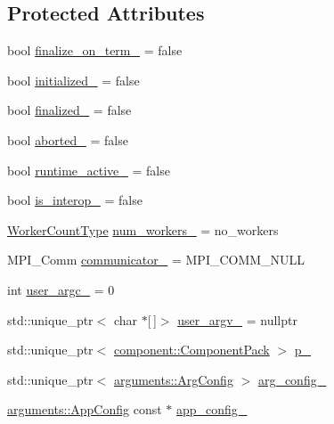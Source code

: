 \subsection*{Protected Attributes}
\begin{DoxyCompactItemize}
\item 
bool \hyperlink{structvt_1_1runtime_1_1_runtime_a1a7a0e6783b3326a4ded84f829a1d0b3}{finalize\+\_\+on\+\_\+term\+\_\+} = false
\item 
bool \hyperlink{structvt_1_1runtime_1_1_runtime_aaaad29e0591814b8f0632f2f85bd5e16}{initialized\+\_\+} = false
\item 
bool \hyperlink{structvt_1_1runtime_1_1_runtime_a2a798a2bf9b8c0a70785cde3cc8119c4}{finalized\+\_\+} = false
\item 
bool \hyperlink{structvt_1_1runtime_1_1_runtime_a19b9ad0859c6fb417b734ac1cc8be1a7}{aborted\+\_\+} = false
\item 
bool \hyperlink{structvt_1_1runtime_1_1_runtime_a0ab12b00f03032638dbc467d165bed30}{runtime\+\_\+active\+\_\+} = false
\item 
bool \hyperlink{structvt_1_1runtime_1_1_runtime_a1169e49a960d59b2e1c7d9f5f9ef838d}{is\+\_\+interop\+\_\+} = false
\item 
\hyperlink{namespacevt_aa93398ea48f2cb6c188512250f7cc248}{Worker\+Count\+Type} \hyperlink{structvt_1_1runtime_1_1_runtime_ae0fc29c09650df6280cabeea1cb9e222}{num\+\_\+workers\+\_\+} = no\+\_\+workers
\item 
M\+P\+I\+\_\+\+Comm \hyperlink{structvt_1_1runtime_1_1_runtime_a91471f214fb5ce904fb2e0bf95b445e2}{communicator\+\_\+} = M\+P\+I\+\_\+\+C\+O\+M\+M\+\_\+\+N\+U\+LL
\item 
int \hyperlink{structvt_1_1runtime_1_1_runtime_ae5c7bb8fdec028e2d505bf29906d5da5}{user\+\_\+argc\+\_\+} = 0
\item 
std\+::unique\+\_\+ptr$<$ char $\ast$\mbox{[}$\,$\mbox{]}$>$ \hyperlink{structvt_1_1runtime_1_1_runtime_a1afbdc2b13376b31c404cdbc091d9162}{user\+\_\+argv\+\_\+} = nullptr
\item 
std\+::unique\+\_\+ptr$<$ \hyperlink{structvt_1_1runtime_1_1component_1_1_component_pack}{component\+::\+Component\+Pack} $>$ \hyperlink{structvt_1_1runtime_1_1_runtime_a9f7ea8f6852d934e9c0122e074df0886}{p\+\_\+}
\item 
std\+::unique\+\_\+ptr$<$ \hyperlink{structvt_1_1arguments_1_1_arg_config}{arguments\+::\+Arg\+Config} $>$ \hyperlink{structvt_1_1runtime_1_1_runtime_a585321b816d6984bf7a9489d00bd3670}{arg\+\_\+config\+\_\+}
\item 
\hyperlink{structvt_1_1arguments_1_1_app_config}{arguments\+::\+App\+Config} const  $\ast$ \hyperlink{structvt_1_1runtime_1_1_runtime_a5fa2ceccc0e96fe0a97e0454e3a0a1ee}{app\+\_\+config\+\_\+}
\end{DoxyCompactItemize}
